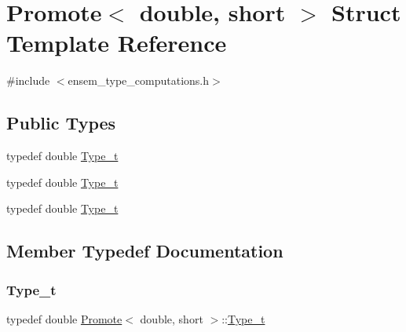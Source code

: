 \hypertarget{structPromote_3_01double_00_01short_01_4}{}\section{Promote$<$ double, short $>$ Struct Template Reference}
\label{structPromote_3_01double_00_01short_01_4}


{\ttfamily \#include $<$ensem\+\_\+type\+\_\+computations.\+h$>$}

\subsection*{Public Types}
\begin{DoxyCompactItemize}
\item 
typedef double \mbox{\hyperlink{structPromote_3_01double_00_01short_01_4_a14e4d674ead4648aefc2f0cee3552301}{Type\+\_\+t}}
\item 
typedef double \mbox{\hyperlink{structPromote_3_01double_00_01short_01_4_a14e4d674ead4648aefc2f0cee3552301}{Type\+\_\+t}}
\item 
typedef double \mbox{\hyperlink{structPromote_3_01double_00_01short_01_4_a14e4d674ead4648aefc2f0cee3552301}{Type\+\_\+t}}
\end{DoxyCompactItemize}


\subsection{Member Typedef Documentation}
\mbox{\label{structPromote_3_01double_00_01short_01_4_a14e4d674ead4648aefc2f0cee3552301}} 
\subsubsection{\texorpdfstring{Type\_t}{Type\_t}\hspace{0.1cm}{\footnotesize\ttfamily [1/3]}}
{\footnotesize\ttfamily typedef double \mbox{\hyperlink{structPromote}{Promote}}$<$ double, short $>$\+::\mbox{\hyperlink{structPromote_3_01double_00_01short_01_4_a14e4d674ead4648aefc2f0cee3552301}{Type\+\_\+t}}}

\mbox{\label{structPromote_3_01double_00_01short_01_4_a14e4d674ead4648aefc2f0cee3552301}} 
